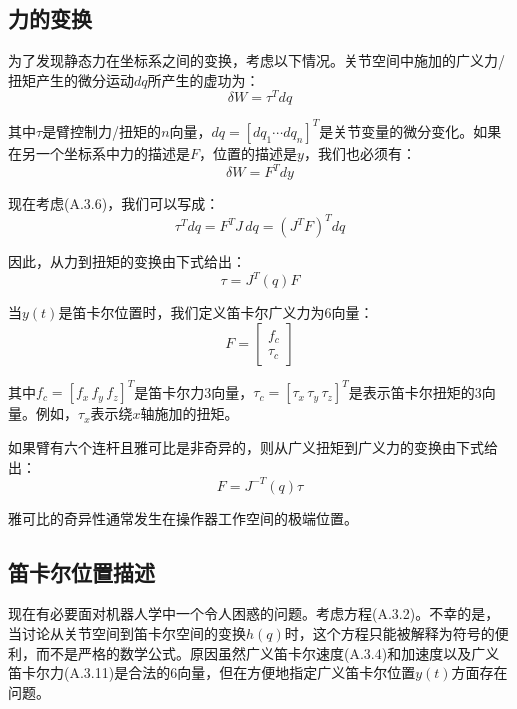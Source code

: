 \documentclass[UTF8,a4paper]{ctexart}
\begin{document}
\subsection{力的变换}

为了发现静态力在坐标系之间的变换，考虑以下情况。关节空间中施加的广义力/扭矩产生的微分运动$dq$所产生的虚功为：
\begin{equation}
\delta W = \tau^T dq
\tag{A.3.8}
\end{equation}

其中$\tau$是臂控制力/扭矩的$n$向量，$dq = [dq_1 \cdots dq_n]^T$是关节变量的微分变化。如果在另一个坐标系中力的描述是$F$，位置的描述是$y$，我们也必须有：
\begin{equation}
\delta W = F^T dy
\tag{A.3.9}
\end{equation}

现在考虑(A.3.6)，我们可以写成：
\begin{equation}
\tau^T dq = F^T J \, dq = (J^T F)^T dq
\end{equation}

因此，从力到扭矩的变换由下式给出：
\begin{equation}
\tau = J^T(q) F
\tag{A.3.10}
\end{equation}

当$y(t)$是笛卡尔位置时，我们定义笛卡尔广义力为6向量：
\begin{equation}
F = \begin{bmatrix} f_c \\ \tau_c \end{bmatrix}
\tag{A.3.11}
\end{equation}

其中$f_c = [f_x \, f_y \, f_z]^T$是笛卡尔力3向量，$\tau_c = [\tau_x \, \tau_y \, \tau_z]^T$是表示笛卡尔扭矩的3向量。例如，$\tau_x$表示绕$x$轴施加的扭矩。

如果臂有六个连杆且雅可比是非奇异的，则从广义扭矩到广义力的变换由下式给出：
\begin{equation}
F = J^{-T}(q)\tau
\tag{A.3.12}
\end{equation}

雅可比的奇异性通常发生在操作器工作空间的极端位置。

\subsection{笛卡尔位置描述}

现在有必要面对机器人学中一个令人困惑的问题。考虑方程(A.3.2)。不幸的是，当讨论从关节空间到笛卡尔空间的变换$h(q)$时，这个方程只能被解释为符号的便利，而不是严格的数学公式。原因虽然广义笛卡尔速度(A.3.4)和加速度以及广义笛卡尔力(A.3.11)是合法的6向量，但在方便地指定广义笛卡尔位置$y(t)$方面存在问题。
\end{document}

